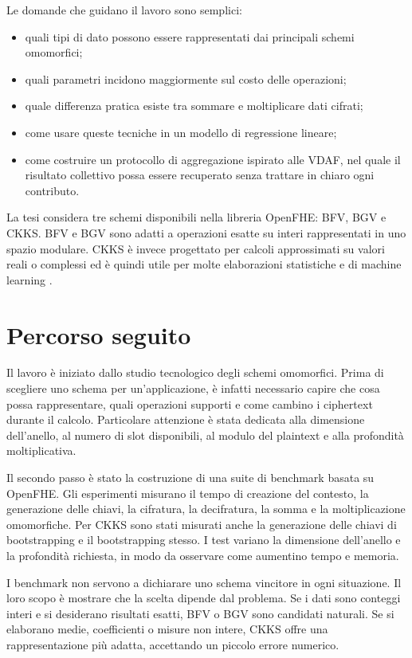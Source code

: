 Le domande che guidano il lavoro sono semplici:
\begin{itemize}
  \item quali tipi di dato possono essere rappresentati dai principali schemi omomorfici;
  \item quali parametri incidono maggiormente sul costo delle operazioni;
  \item quale differenza pratica esiste tra sommare e moltiplicare dati cifrati;
  \item come usare queste tecniche in un modello di regressione lineare;
  \item come costruire un protocollo di aggregazione ispirato alle VDAF, nel quale il risultato collettivo possa essere recuperato senza trattare in chiaro ogni contributo.
\end{itemize}

La tesi considera tre schemi disponibili nella libreria OpenFHE: BFV, BGV e CKKS. BFV e BGV sono adatti a operazioni esatte su interi rappresentati in uno spazio modulare. CKKS \`e invece progettato per calcoli approssimati su valori reali o complessi ed \`e quindi utile per molte elaborazioni statistiche e di machine learning \cite{openfhe,ckks}.

\section{Percorso seguito}
Il lavoro \`e iniziato dallo studio tecnologico degli schemi omomorfici. Prima di scegliere uno schema per un'applicazione, \`e infatti necessario capire che cosa possa rappresentare, quali operazioni supporti e come cambino i ciphertext durante il calcolo. Particolare attenzione \`e stata dedicata alla dimensione dell'anello, al numero di slot disponibili, al modulo del plaintext e alla profondit\`a moltiplicativa.

Il secondo passo \`e stato la costruzione di una suite di benchmark basata su OpenFHE. Gli esperimenti misurano il tempo di creazione del contesto, la generazione delle chiavi, la cifratura, la decifratura, la somma e la moltiplicazione omomorfiche. Per CKKS sono stati misurati anche la generazione delle chiavi di bootstrapping e il bootstrapping stesso. I test variano la dimensione dell'anello e la profondit\`a richiesta, in modo da osservare come aumentino tempo e memoria.

I benchmark non servono a dichiarare uno schema vincitore in ogni situazione. Il loro scopo \`e mostrare che la scelta dipende dal problema. Se i dati sono conteggi interi e si desiderano risultati esatti, BFV o BGV sono candidati naturali. Se si elaborano medie, coefficienti o misure non intere, CKKS offre una rappresentazione pi\`u adatta, accettando un piccolo errore numerico.

